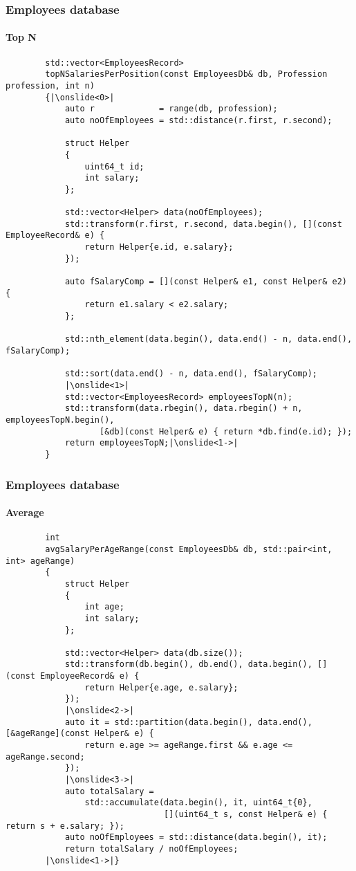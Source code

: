 \documentclass{beamer}
\begin{document}
\begin{frame}[fragile]
\frametitle{Employees database}
\framesubtitle{Top N}
	\begin{lstlisting}
		std::vector<EmployeesRecord>
		topNSalariesPerPosition(const EmployeesDb& db, Profession profession, int n)
		{|\onslide<0>|
		    auto r             = range(db, profession);
		    auto noOfEmployees = std::distance(r.first, r.second);
		
		    struct Helper
		    {
		        uint64_t id;
		        int salary;
		    };
					
		    std::vector<Helper> data(noOfEmployees);
		    std::transform(r.first, r.second, data.begin(), [](const EmployeeRecord& e) {
		        return Helper{e.id, e.salary};
		    });
			
		    auto fSalaryComp = [](const Helper& e1, const Helper& e2) {
        		return e1.salary < e2.salary;
    		};
    		
			std::nth_element(data.begin(), data.end() - n, data.end(), fSalaryComp);
			
    		std::sort(data.end() - n, data.end(), fSalaryComp);
			|\onslide<1>|
		    std::vector<EmployeesRecord> employeesTopN(n);
		    std::transform(data.rbegin(), data.rbegin() + n, employeesTopN.begin(),
                   [&db](const Helper& e) { return *db.find(e.id); });
		    return employeesTopN;|\onslide<1->|
		}
	\end{lstlisting}
\end{frame}

\begin{frame}[fragile]
\frametitle{Employees database}
\framesubtitle{Average}
	\begin{lstlisting}
		int
		avgSalaryPerAgeRange(const EmployeesDb& db, std::pair<int, int> ageRange)
		{
		    struct Helper
		    {
		        int age;
		        int salary;
		    };
		
		    std::vector<Helper> data(db.size());
		    std::transform(db.begin(), db.end(), data.begin(), [](const EmployeeRecord& e) {
		        return Helper{e.age, e.salary};
		    });
			|\onslide<2->|	
		    auto it = std::partition(data.begin(), data.end(), [&ageRange](const Helper& e) {
		        return e.age >= ageRange.first && e.age <= ageRange.second;
		    });
			|\onslide<3->|
		    auto totalSalary =
		        std::accumulate(data.begin(), it, uint64_t{0},
		                        [](uint64_t s, const Helper& e) { return s + e.salary; });
		    auto noOfEmployees = std::distance(data.begin(), it);
		    return totalSalary / noOfEmployees;
		|\onslide<1->|}
	\end{lstlisting}
\end{frame}
\end{document}
